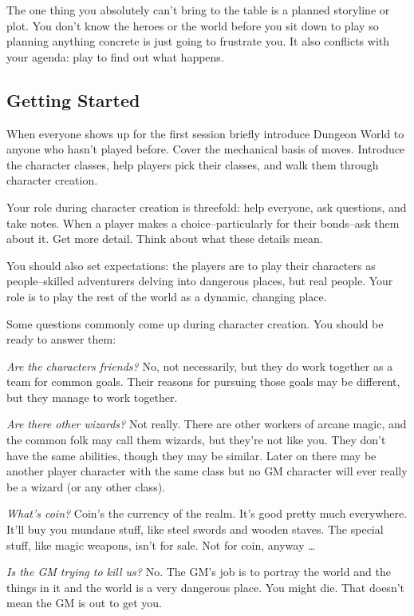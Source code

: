  The one thing you absolutely can't bring to the table is a planned storyline or plot. You don't know the heroes or the world before you sit down to play so planning anything concrete is just going to frustrate you. It also conflicts with your agenda: play to find out what happens.
\subsection{Getting Started}


 When everyone shows up for the first session briefly introduce Dungeon World to anyone who hasn't played before. Cover the mechanical basis of moves. Introduce the character classes, help players pick their classes, and walk them through character creation.


 Your role during character creation is threefold: help everyone, ask questions, and take notes. When a player makes a choice--particularly for their bonds--ask them about it. Get more detail. Think about what these details mean.


 You should also set expectations: the players are to play their characters as people--skilled adventurers delving into dangerous places, but real people. Your role is to play the rest of the world as a dynamic, changing place.


 Some questions commonly come up during character creation. You should be ready to answer them:


 \emph{Are the characters friends?}
 No, not necessarily, but they do work together as a team for common goals. Their reasons for pursuing those goals may be different, but they manage to work together.


 \emph{Are there other wizards?}
 Not really. There are other workers of arcane magic, and the common folk may call them wizards, but they're not like you. They don't have the same abilities, though they may be similar. Later on there may be another player character with the same class but no GM character will ever really be a wizard (or any other class).


 \emph{What's coin?}
 Coin's the currency of the realm. It's good pretty much everywhere. It'll buy you mundane stuff, like steel swords and wooden staves. The special stuff, like magic weapons, isn't for sale. Not for coin, anyway \ldots 


 \emph{Is the GM trying to kill us?}
 No. The GM's job is to portray the world and the things in it and the world is a very dangerous place. You might die. That doesn't mean the GM is out to get you.


